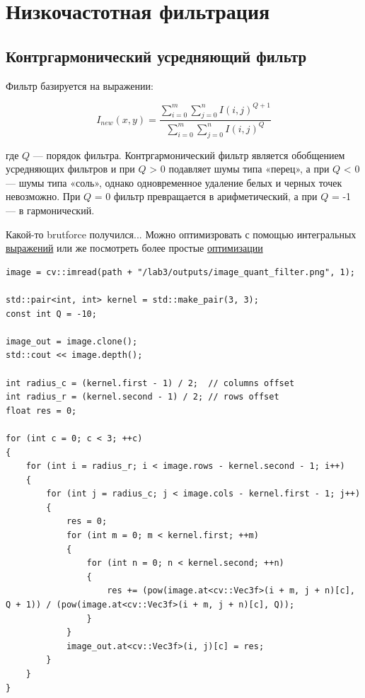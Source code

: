 \pagebreak

\section{Низкочастотная фильтрация}

\subsection{Контргармонический усредняющий фильтр}

Фильтр базируется на выражении:

\begin{equation}
    I_{new}(x, y) = \frac{\sum_{i=0}^{m}\sum_{j=0}^{n} I(i, j) ^ {Q+1}}{\sum_{i=0}^{m}\sum_{j=0}^{n} I(i, j) ^ Q}
\label{eq:complex_func}
\end{equation}

где $Q$ — порядок фильтра. Контргармонический фильтр является
обобщением усредняющих фильтров и при $Q$ > 0 подавляет шумы
типа «перец», а при $Q$ < 0 — шумы типа «соль», однако одновременное удаление 
белых и черных точек невозможно. При $Q$ = 0 фильтр превращается в арифметический, 
а при $Q$ = -1 — в гармонический.

Какой-то brutforce получился... Можно оптимизровать с помощью интегральных \href{https://en.wikipedia.org/wiki/Summed-area_table}{выражений} или же посмотреть более простые \href{https://github.com/BBuf/Image-processing-algorithm}{оптимизации}

\begin{lstlisting}[style=cpp_white, caption={Исходный код для контргармонического усредняющего фильтра}]
image = cv::imread(path + "/lab3/outputs/image_quant_filter.png", 1);

std::pair<int, int> kernel = std::make_pair(3, 3);
const int Q = -10;

image_out = image.clone();
std::cout << image.depth();

int radius_c = (kernel.first - 1) / 2;  // columns offset
int radius_r = (kernel.second - 1) / 2; // rows offset
float res = 0;

for (int c = 0; c < 3; ++c)
{
    for (int i = radius_r; i < image.rows - kernel.second - 1; i++)
    {
        for (int j = radius_c; j < image.cols - kernel.first - 1; j++)
        {
            res = 0;
            for (int m = 0; m < kernel.first; ++m)
            {
                for (int n = 0; n < kernel.second; ++n)
                {
                    res += (pow(image.at<cv::Vec3f>(i + m, j + n)[c], Q + 1)) / (pow(image.at<cv::Vec3f>(i + m, j + n)[c], Q));
                }
            }
            image_out.at<cv::Vec3f>(i, j)[c] = res;
        }
    }
}
\end{lstlisting}

